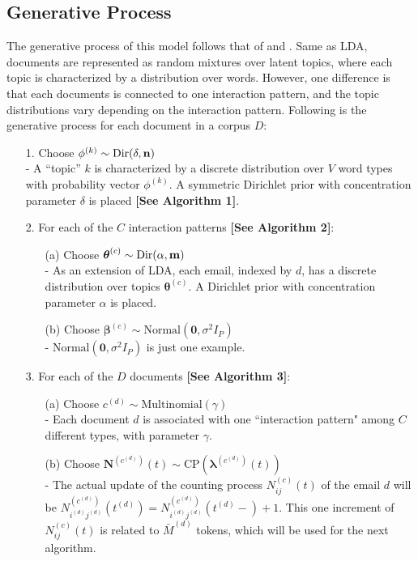 \documentclass[a4paper]{article}
\begin{document}
\subsection{Generative Process}
The generative process of this model follows that of \cite{Blei2003} and \cite{rosen2004author}. Same as LDA, documents are represented as random mixtures over latent topics, where each topic is characterized by a distribution over words. However, one difference is that each documents is connected to one interaction pattern, and the topic distributions vary depending on the interaction pattern. Following is the generative process for each document in a corpus $D$:
\begin{itemize}
	\item[1.] {Choose $\phi^{(k)} \sim \mbox{Dir}(\delta, \bf n)$}\\
	- A “topic” $k$ is characterized by a discrete distribution over $V$ word types with probability vector $\phi^{(k)}$. A symmetric Dirichlet prior with concentration parameter $\delta$ is placed \textbf{[See Algorithm 1]}.
\item[2.] For each of the $C$ interaction patterns \textbf{[See Algorithm 2]}:
\begin{itemize}
	\item[(a)] Choose $\boldsymbol{\theta}^{(c)}\sim \mbox{Dir}(\alpha, \bf m)$\\
- As an extension of LDA, each email, indexed by $d$, has a discrete distribution over topics $\boldsymbol{\theta}^{(c)}$. A Dirichlet prior
with concentration parameter $\alpha$ is placed.
\item[(b)] Choose $\boldsymbol{\beta}^{(c)}\sim \mbox{Normal}(\textbf{0}, \sigma^2I_P)$\\ 
- $\mbox{Normal}(\textbf{0}, \sigma^2I_P)$ is just one example.
\end{itemize}
\item[3.] For each of the $D$ documents \textbf{[See Algorithm 3]}:
\begin{itemize}
	\item[(a)] Choose $c^{(d)}\sim \mbox{Multinomial}(\gamma)$\\
	- Each document $d$ is associated with one ``interaction pattern" among $C$ different types, with parameter $\gamma$.
	\item[(b)] Choose $\boldsymbol{N}^{(c^{(d)})}(t) \sim \mbox{CP}(\boldsymbol{\lambda}^{(c^{(d)})}(t))$\\
	- The actual update of the counting process $N^{(c)}_{ij}(t)$ of the email $d$ will be  $N^{(c^{(d)})}_{i^{(d)}j^{(d)}}(t^{(d)})=N^{(c^{(d)})}_{i^{(d)}j^{(d)}}(t^{(d)}-)+1$. This one increment of $N^{(c)}_{ij}(t)$ is related to $\bar{M}^{(d)}$ tokens, which will be used for the next algorithm.

\end{itemize}
\end{itemize}
\end{document}
